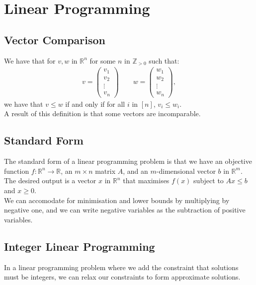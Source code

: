 \section{Linear Programming}

\subsection{Vector Comparison}

We have that for $v, w$ in $\mathbb{R}^n$ for some $n$ in $\mathbb{Z}_{>0}$ such that: 
\begin{gather*}
  v = \begin{pmatrix}
    v_1 \\ v_2 \\ \vdots \\ v_n
  \end{pmatrix} \qquad
  w = \begin{pmatrix}
    w_1 \\ w_2 \\ \vdots \\ w_n
  \end{pmatrix},
\end{gather*} we have that $v \leq w$ if and only if for all $i$ in $[n]$, $v_i \leq w_i$.
\\[\baselineskip]
A result of this definition is that some vectors are incomparable.

\subsection{Standard Form}

The standard form of a linear programming problem is that we have an objective function
$f : \mathbb{R}^n \to \mathbb{R}$, an $m \times n$ matrix $A$, and an $m$-dimensional
vector $b$ in $\mathbb{R}^m$. The desired output is a vector $x$ in $\mathbb{R}^n$ that 
maximises $f(x)$ subject to $Ax \leq b$ and $x \geq 0$.
\\[\baselineskip]
We can accomodate for minimisation and lower bounds by multiplying by negative one, and
we can write negative variables as the subtraction of positive variables.

\subsection{Integer Linear Programming}

In a linear programming problem where we add the constraint that solutions must be
integers, we can relax our constraints to form approximate solutions.